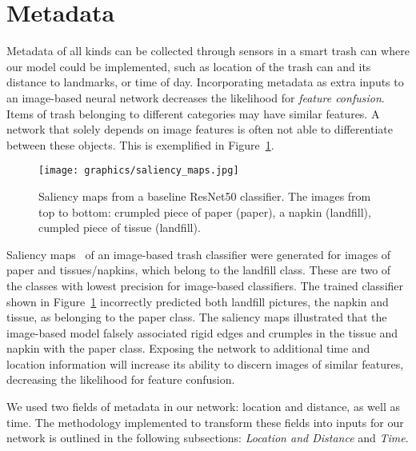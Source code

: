 \documentclass[conference]{ieeeconf}
\begin{document}
\section{Metadata}

Metadata of all kinds can be collected through sensors in a smart trash can where our model could be implemented, such as location of the trash can and its distance to landmarks, or time of day. Incorporating metadata as extra inputs to an image-based neural network decreases the likelihood for \emph{feature confusion}. Items of trash belonging to different categories may have similar features. A network that solely depends on image features is often not able to differentiate between these objects. This is exemplified in Figure~\ref{fig:saliencymaps}.

\begin{figure}
\centering
  \texttt{[image: graphics/saliency\_maps.jpg]}
  \caption{Saliency maps from a baseline ResNet50 classifier. The images from top to bottom: crumpled piece of paper (paper), a napkin (landfill), cumpled piece of tissue (landfill).}
  \label{fig:saliencymaps}
\end{figure}


Saliency maps~\cite{SaliencyMaps} of an image-based trash classifier were generated for images of paper and tissues/napkins, which belong to the landfill class. These are two of the classes with lowest precision for image-based classifiers. The trained classifier shown in Figure~\ref{fig:saliencymaps} incorrectly predicted both landfill pictures, the napkin and tissue, as belonging to the paper class. The saliency maps illustrated that the image-based model falsely associated rigid edges and crumples in the tissue and napkin with the paper class. Exposing the network to additional time and location information will increase its ability to discern images of similar features, decreasing the likelihood for feature confusion.

We used two fields of metadata in our network: location and distance, as well as time. The methodology implemented to transform these fields into inputs for our network is outlined in the following subsections: \emph{Location and Distance} and \emph{Time}.



\end{document}
